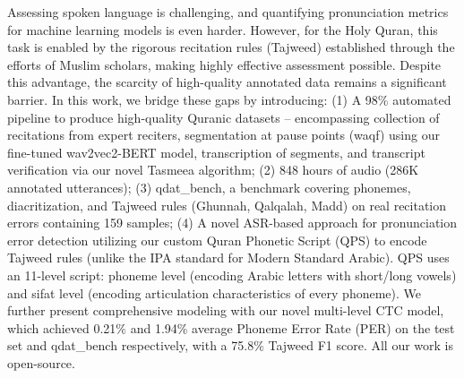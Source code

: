 Assessing spoken language is challenging, and quantifying pronunciation metrics for machine learning models is even harder. However, for the Holy Quran, this task is enabled by the rigorous recitation rules (Tajweed) established through the efforts of Muslim scholars, making highly effective assessment possible. Despite this advantage, the scarcity of high-quality annotated data remains a significant barrier. In this work, we bridge these gaps by introducing: (1) A 98\% automated pipeline to produce high-quality Quranic datasets -- encompassing collection of recitations from expert reciters, segmentation at pause points (waqf) using our fine-tuned wav2vec2-BERT model, transcription of segments, and transcript verification via our novel Tasmeea algorithm; (2) 848 hours of audio (286K annotated utterances); (3) qdat\_bench, a benchmark covering phonemes, diacritization, and Tajweed rules (Ghunnah, Qalqalah, Madd) on real recitation errors containing 159 samples; (4) A novel ASR-based approach for pronunciation error detection utilizing our custom Quran Phonetic Script (QPS) to encode Tajweed rules (unlike the IPA standard for Modern Standard Arabic). QPS uses an 11-level script: phoneme level (encoding Arabic letters with short/long vowels) and sifat level (encoding articulation characteristics of every phoneme). We further present comprehensive modeling with our novel multi-level CTC model, which achieved 0.21\% and 1.94\% average Phoneme Error Rate (PER) on the test set and qdat\_bench respectively, with a 75.8\% Tajweed F1 score. All our work is open-source. %

